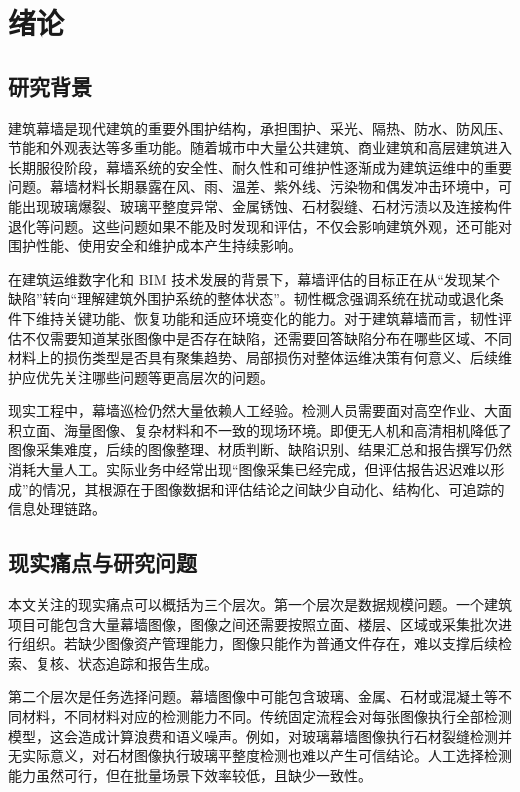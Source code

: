 \chapter{绪论}
\label{chap:introduction}

\section{研究背景}
\label{sec:intro-background}

建筑幕墙是现代建筑的重要外围护结构，承担围护、采光、隔热、防水、防风压、节能和外观表达等多重功能。随着城市中大量公共建筑、商业建筑和高层建筑进入长期服役阶段，幕墙系统的安全性、耐久性和可维护性逐渐成为建筑运维中的重要问题。幕墙材料长期暴露在风、雨、温差、紫外线、污染物和偶发冲击环境中，可能出现玻璃爆裂、玻璃平整度异常、金属锈蚀、石材裂缝、石材污渍以及连接构件退化等问题。这些问题如果不能及时发现和评估，不仅会影响建筑外观，还可能对围护性能、使用安全和维护成本产生持续影响。

在建筑运维数字化和 BIM 技术发展的背景下，幕墙评估的目标正在从“发现某个缺陷”转向“理解建筑外围护系统的整体状态”。韧性概念强调系统在扰动或退化条件下维持关键功能、恢复功能和适应环境变化的能力。对于建筑幕墙而言，韧性评估不仅需要知道某张图像中是否存在缺陷，还需要回答缺陷分布在哪些区域、不同材料上的损伤类型是否具有聚集趋势、局部损伤对整体运维决策有何意义、后续维护应优先关注哪些问题等更高层次的问题。

现实工程中，幕墙巡检仍然大量依赖人工经验。检测人员需要面对高空作业、大面积立面、海量图像、复杂材料和不一致的现场环境。即便无人机和高清相机降低了图像采集难度，后续的图像整理、材质判断、缺陷识别、结果汇总和报告撰写仍然消耗大量人工。实际业务中经常出现“图像采集已经完成，但评估报告迟迟难以形成”的情况，其根源在于图像数据和评估结论之间缺少自动化、结构化、可追踪的信息处理链路。

\section{现实痛点与研究问题}
\label{sec:intro-pain-points}

本文关注的现实痛点可以概括为三个层次。第一个层次是数据规模问题。一个建筑项目可能包含大量幕墙图像，图像之间还需要按照立面、楼层、区域或采集批次进行组织。若缺少图像资产管理能力，图像只能作为普通文件存在，难以支撑后续检索、复核、状态追踪和报告生成。

第二个层次是任务选择问题。幕墙图像中可能包含玻璃、金属、石材或混凝土等不同材料，不同材料对应的检测能力不同。传统固定流程会对每张图像执行全部检测模型，这会造成计算浪费和语义噪声。例如，对玻璃幕墙图像执行石材裂缝检测并无实际意义，对石材图像执行玻璃平整度检测也难以产生可信结论。人工选择检测能力虽然可行，但在批量场景下效率较低，且缺少一致性。

